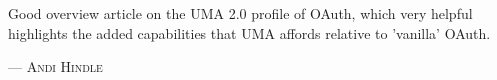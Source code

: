 Good overview article on the UMA 2.0 profile of OAuth, which very helpful highlights the added capabilities that UMA affords relative to 'vanilla' OAuth.
\setlength{\parindent}{0cm}\par\textsc{ --- Andi Hindle }\par\vspace{12pt}\setlength{\parindent}{15pt}
